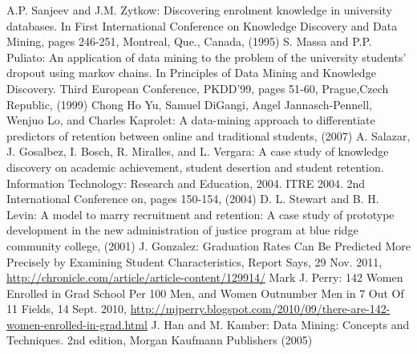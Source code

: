 \documentclass[runningheads,a4paper]{llncs}
\begin{document}
\begin{thebibliography}{10}
 A.P. Sanjeev and J.M. Zytkow: Discovering enrolment knowledge in university databases. In First International Conference on Knowledge Discovery and Data Mining, pages 246-251, Montreal, Que., Canada, (1995)
 S. Massa and P.P. Puliato: An application of data mining to the problem of the university students' dropout using markov chains. In Principles of Data Mining and Knowledge Discovery. Third European Conference, PKDD'99, pages 51-60, Prague,Czech Republic, (1999)
 Chong Ho Yu, Samuel DiGangi, Angel Jannasch-Pennell, Wenjuo Lo, and Charles Kaprolet: A data-mining approach to differentiate predictors of retention between online and traditional students, (2007)
 A. Salazar, J. Gosalbez, I. Bosch, R. Miralles, and L. Vergara: A case study of knowledge discovery on academic achievement, student desertion and student retention. Information Technology: Research and Education, 2004. ITRE 2004. 2nd International Conference on, pages 150-154, (2004)
 D. L. Stewart and B. H. Levin: A model to marry recruitment and retention: A case study of prototype development in the new administration of justice program at blue ridge community college, (2001)
 J. Gonzalez: Graduation Rates Can Be Predicted More Precisely by Examining Student Characteristics, Report Says, 29 Nov. 2011, \url{http://chronicle.com/article/article-content/129914/}
 Mark J. Perry: 142 Women Enrolled in Grad School Per 100 Men, and Women Outnumber Men in 7 Out Of 11 Fields, 14 Sept. 2010, \url{http://mjperry.blogspot.com/2010/09/there-are-142-women-enrolled-in-grad.html}
 J. Han and M. Kamber: Data Mining: Concepts and Techniques. 2nd edition, Morgan Kaufmann Publishers (2005)

\end{thebibliography}
\end{document}
